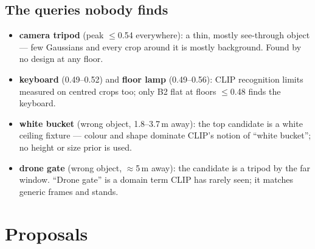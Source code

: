 \documentclass[11pt,a4paper]{article}
\begin{document}
\subsection{The queries nobody finds}
\begin{itemize}
  \item \textbf{camera tripod} (peak $\le$0.54 everywhere): a thin, mostly see-through object --- few Gaussians and every
        crop around it is mostly background. Found by no design at any floor.
  \item \textbf{keyboard} (0.49--0.52) and \textbf{floor lamp} (0.49--0.56): CLIP recognition limits measured on centred
        crops too; only B2 flat at floors $\le$0.48 finds the keyboard.
  \item \textbf{white bucket} (wrong object, 1.8--3.7\,m away): the top candidate is a white ceiling fixture --- colour and
        shape dominate CLIP's notion of ``white bucket''; no height or size prior is used.
  \item \textbf{drone gate} (wrong object, $\approx$5\,m away): the candidate is a tripod by the far window. ``Drone gate'' is
        a domain term CLIP has rarely seen; it matches generic frames and stands.
\end{itemize}

\section{Proposals}
\end{document}
